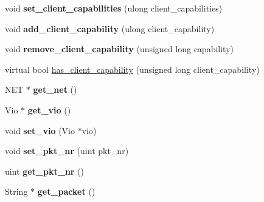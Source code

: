 \begin{DoxyCompactItemize}
\item 
\mbox{\label{classProtocol__classic_a48a999b31a267b20b4422074c2c0cc98}} 
void {\bfseries set\+\_\+client\+\_\+capabilities} (ulong client\+\_\+capabilities)
\item 
\mbox{\label{classProtocol__classic_a6b7112abaa3321ea7597f97ad86dfdc5}} 
void {\bfseries add\+\_\+client\+\_\+capability} (ulong client\+\_\+capability)
\item 
\mbox{\label{classProtocol__classic_a9df3d2661de396c5fa659e0bdcc846dd}} 
void {\bfseries remove\+\_\+client\+\_\+capability} (unsigned long capability)
\item 
virtual bool \mbox{\hyperlink{classProtocol__classic_a13ece31bc9fee31fdc6668d326bbb413}{has\+\_\+client\+\_\+capability}} (unsigned long client\+\_\+capability)
\item 
\mbox{\label{classProtocol__classic_a1bc799110f1c1c71cfdf43eb8073d2ec}} 
N\+ET $\ast$ {\bfseries get\+\_\+net} ()
\item 
\mbox{\label{classProtocol__classic_a8db599c5717485f66ee4ade018c59997}} 
Vio $\ast$ {\bfseries get\+\_\+vio} ()
\item 
\mbox{\label{classProtocol__classic_a071d9875134374accb48c315414a4266}} 
void {\bfseries set\+\_\+vio} (Vio $\ast$vio)
\item 
\mbox{\label{classProtocol__classic_a5a15ea9a3a68c7d79ddc94a318aa296f}} 
void {\bfseries set\+\_\+pkt\+\_\+nr} (uint pkt\+\_\+nr)
\item 
\mbox{\label{classProtocol__classic_abbbf940146a97a77da4b488c02a254d4}} 
uint {\bfseries get\+\_\+pkt\+\_\+nr} ()
\item 
\mbox{\label{classProtocol__classic_a84d35d53ef05856566d60ed5f070f3fb}} 
String $\ast$ {\bfseries get\+\_\+packet} ()
\item 
\mbox{\label{classProtocol__classic_ae368c751fb4f89517409d9995318553e}} 

\end{DoxyCompactItemize}

